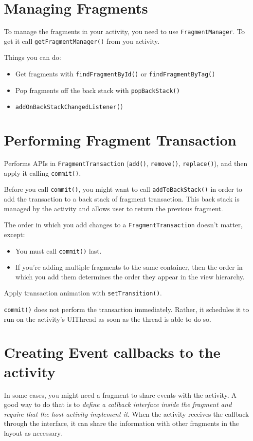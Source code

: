 \documentclass[11pt, a4paper]{book}
\begin{document}
\section{Managing Fragments}
To manage the fragments in your activity, you need to use
\verb|FragmentManager|. To get it call \verb|getFragmentManager()| from you
activity.

Things you can do:
\begin{itemize}
\item Get fragments with \verb|findFragmentById()| or \verb|findFragmentByTag()|
\item Pop fragments off the back stack with \verb|popBackStack()|
\item \verb|addOnBackStackChangedListener()|
\end{itemize}
\section{Performing Fragment Transaction}
Performs APIs in \verb|FragmentTransaction| (\verb|add()|, \verb|remove()|,
\verb|replace()|), and then apply it calling \verb|commit()|.

Before you call \verb|commit()|, you might want to call \verb|addToBackStack()|
in order to add the transaction to a back stack of fragment transaction. This
back stack is managed by the activity and allows user to return the previous
fragment.

The order in which you add changes to a \verb|FragmentTransaction| doesn't
matter, except:
\begin{itemize}
\item You must call \verb|commit()| last.
\item If you're adding multiple fragments to the same container, then the order
in which you add them determines the order they appear in the view hierarchy.
\end{itemize}
Apply transaction animation with \verb|setTransition()|.

\verb|commit()| does not perform the transaction immediately. Rather, it
schedules it to run on the activity's UIThread as soon as the thread is able to
do so.
\section{Creating Event callbacks to the activity}
In some cases, you might need a fragment to share events with the activity. A
good way to do that is to \emph{define a callback interface inside the fragment
and require that the host activity implement it}. When the activity receives the
callback through the interface, it can share the information with other
fragments in the layout as necessary.
\end{document}
